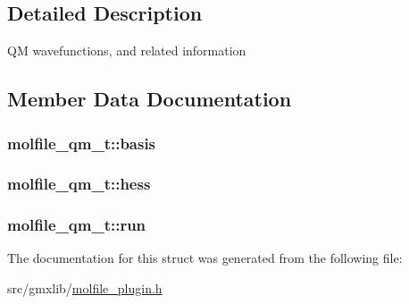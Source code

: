 \subsection{\-Detailed \-Description}
\-Q\-M wavefunctions, and related information 

\subsection{\-Member \-Data \-Documentation}
\hypertarget{structmolfile__qm__t_a90ba6314a65ca045e7932f00e51cd4e3}{
\subsubsection[{basis}]{ {\bf molfile\-\_\-qm\-\_\-t\-::basis}}}\label{structmolfile__qm__t_a90ba6314a65ca045e7932f00e51cd4e3}
\hypertarget{structmolfile__qm__t_ac582b339912010afeeb396dc21d27f1b}{
\subsubsection[{hess}]{ {\bf molfile\-\_\-qm\-\_\-t\-::hess}}}\label{structmolfile__qm__t_ac582b339912010afeeb396dc21d27f1b}
\hypertarget{structmolfile__qm__t_a732532e2eb6d9ce2fa960902ac4dfdea}{
\subsubsection[{run}]{ {\bf molfile\-\_\-qm\-\_\-t\-::run}}}\label{structmolfile__qm__t_a732532e2eb6d9ce2fa960902ac4dfdea}


\-The documentation for this struct was generated from the following file\-:\begin{DoxyCompactItemize}
\item 
src/gmxlib/\hyperlink{molfile__plugin_8h}{molfile\-\_\-plugin.\-h}\end{DoxyCompactItemize}
